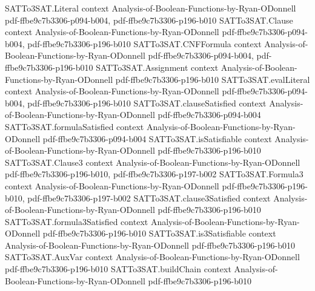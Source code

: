 \begin{theorem}
\label{SATTo3SAT.SAT_to_3SAT_soundness}
\leanok
{}
\proofstep
  {SATTo3SAT.Literal}
  {context}
  {Analysis-of-Boolean-Functions-by-Ryan-ODonnell}
  {pdf-ffbe9c7b3306-p094-b004,
    pdf-ffbe9c7b3306-p196-b010}
\proofstep
  {SATTo3SAT.Clause}
  {context}
  {Analysis-of-Boolean-Functions-by-Ryan-ODonnell}
  {pdf-ffbe9c7b3306-p094-b004,
    pdf-ffbe9c7b3306-p196-b010}
\proofstep
  {SATTo3SAT.CNFFormula}
  {context}
  {Analysis-of-Boolean-Functions-by-Ryan-ODonnell}
  {pdf-ffbe9c7b3306-p094-b004,
    pdf-ffbe9c7b3306-p196-b010}
\proofstep
  {SATTo3SAT.Assignment}
  {context}
  {Analysis-of-Boolean-Functions-by-Ryan-ODonnell}
  {pdf-ffbe9c7b3306-p196-b010}
\proofstep
  {SATTo3SAT.evalLiteral}
  {context}
  {Analysis-of-Boolean-Functions-by-Ryan-ODonnell}
  {pdf-ffbe9c7b3306-p094-b004,
    pdf-ffbe9c7b3306-p196-b010}
\proofstep
  {SATTo3SAT.clauseSatisfied}
  {context}
  {Analysis-of-Boolean-Functions-by-Ryan-ODonnell}
  {pdf-ffbe9c7b3306-p094-b004}
\proofstep
  {SATTo3SAT.formulaSatisfied}
  {context}
  {Analysis-of-Boolean-Functions-by-Ryan-ODonnell}
  {pdf-ffbe9c7b3306-p094-b004}
\proofstep
  {SATTo3SAT.isSatisfiable}
  {context}
  {Analysis-of-Boolean-Functions-by-Ryan-ODonnell}
  {pdf-ffbe9c7b3306-p196-b010}
\proofstep
  {SATTo3SAT.Clause3}
  {context}
  {Analysis-of-Boolean-Functions-by-Ryan-ODonnell}
  {pdf-ffbe9c7b3306-p196-b010,
    pdf-ffbe9c7b3306-p197-b002}
\proofstep
  {SATTo3SAT.Formula3}
  {context}
  {Analysis-of-Boolean-Functions-by-Ryan-ODonnell}
  {pdf-ffbe9c7b3306-p196-b010,
    pdf-ffbe9c7b3306-p197-b002}
\proofstep
  {SATTo3SAT.clause3Satisfied}
  {context}
  {Analysis-of-Boolean-Functions-by-Ryan-ODonnell}
  {pdf-ffbe9c7b3306-p196-b010}
\proofstep
  {SATTo3SAT.formula3Satisfied}
  {context}
  {Analysis-of-Boolean-Functions-by-Ryan-ODonnell}
  {pdf-ffbe9c7b3306-p196-b010}
\proofstep
  {SATTo3SAT.is3Satisfiable}
  {context}
  {Analysis-of-Boolean-Functions-by-Ryan-ODonnell}
  {pdf-ffbe9c7b3306-p196-b010}
\proofstep
  {SATTo3SAT.AuxVar}
  {context}
  {Analysis-of-Boolean-Functions-by-Ryan-ODonnell}
  {pdf-ffbe9c7b3306-p196-b010}
\proofstep
  {SATTo3SAT.buildChain}
  {context}
  {Analysis-of-Boolean-Functions-by-Ryan-ODonnell}
  {pdf-ffbe9c7b3306-p196-b010}
\proofstep

\end{theorem}
